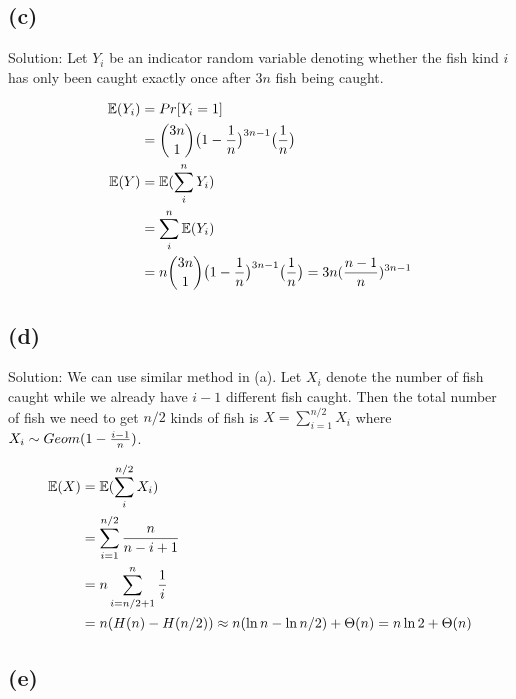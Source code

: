 \documentclass[10pt]{537homework}
\begin{document}

\subsection*{(c)}

Solution: Let $Y_i$ be an indicator random variable denoting whether the fish kind $i$ has only been caught exactly once after $3n$ fish being caught. 

\begin{align*}
  \mathbb{E}(Y_i)   & = Pr[Y_i = 1] \\
                    & = {3n \choose 1} \big( 1 - {1\over n}\big)^{3n-1}\big( {1\over n}\big) \\
  \mathbb{E}(Y)     & = \mathbb{E}(\sum_i^n Y_i) \\
                    & = \sum_i^n \mathbb{E}(Y_i) \\
                    & = n{3n \choose 1} \big( 1 - {1\over n}\big)^{3n-1}\big( {1\over n}\big) = 3n({n-1 \over n})^{3n-1}
\end{align*}



\subsection*{(d)}

Solution: We can use similar method in (a). Let $X_i$ denote the number of fish caught while we already have $i-1$ different fish caught. Then the total number of fish we need to get $n/2$ kinds of fish is $X = \sum_{i=1}^{n/2} X_i$ where $X_i \sim Geom(1-{i-1 \over n})$. 

\begin{align*}
  \mathbb{E}(X)     & = \mathbb{E}(\sum_{i}^{n/2} X_i) \\
                    & = \sum_{i=1}^{n/2} {n \over n-i+1} \\
                    & = n\sum_{i=n/2+1}^n {1\over i} \\
                    & = n (H(n) - H(n/2)) \approx n(\ln{n} - \ln{n/2}) + \Theta (n) = n \ln{2} + \Theta(n)
\end{align*}



\subsection*{(e)}
\end{document}
